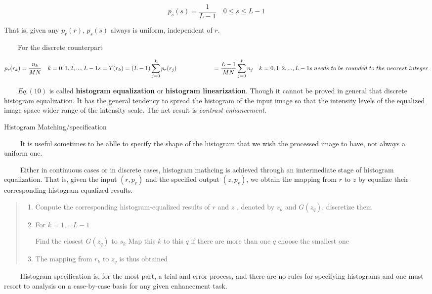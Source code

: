 \documentclass[]{article}
\begin{document}
\[p_s(s)=\dfrac{1}{L-1}\quad0\leq s\leq L-1\]

That is, given any \(p_r(r)\), \(p_s(s)\) always is uniform, independent
of \(r\).

\(\qquad\)For the discrete counterpart

\[p_r(r_k)=\dfrac{n_k}{MN}\quad k=0,1,2,...,L-1\\
s=T(r_k)=(L-1)\sum\limits^k_{j=0}p_r(r_j)\\
\qquad\qquad\quad\quad=\dfrac{L-1}{MN}\sum\limits^k_{j=0}n_j\quad k=0,1,2,...,L-1\\
s \; needs\ to\ be\ rounded\ to\ the\ nearest\ integer\]

\(\qquad\)\(Eq. (10)\) is called \textbf{histogram equalization} or
\textbf{histogram linearization}. Though it cannot be proved in general
that discrete histogram equalization. It has the general tendency to
spread the histogram of the input image so that the intensity levels of
the equalized image space wider range of the intensity scale. The net
result is \emph{contrast enhancement}.

Histogram Matching/specification

\(\quad\quad\) It is useful sometimes to be ablle to specify the shape
of the histogram that we wish the processed image to have, not always a
uniform one.

\(\quad\quad\) Either in continuous cases or in discrete cases,
histogram mathcing is achieved through an imtermediate stage of
histogram equalization. That is, given the input \((r, p_r)\) and the
specified output \((z,p_r)\), we obtain the mapping from \(r\) to \(z\)
by equalize their corresponding histogram equalized results.

\begin{quote}
\begin{enumerate}
\def\labelenumi{\arabic{enumi}.}
\item
  Conpute the corresponding histogram-equalized results of \(r\) and
  \(z\) , denoted by \(s_k\) and \(G(z_q)\), discretize them
\item
  For \(k=1,...L-1\)

   Find the closest \(G(z_q)\) to \(s_k\) Map this \(k\) to this \(q\)
  if there are more than one \(q\) choose the smallest one
\item
  The mapping from \(r_k\) to \(z_q\) is thus obtained
\end{enumerate}
\end{quote}

\(\quad\quad\) Histogram specification is, for the most part, a trial
and error process, and there are no rules for specifying histograms and
one must resort to analysis on a case-by-case basis for any given
enhancement task.
\end{document}
